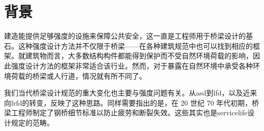 \section{背景}
建造能提供足够强度的设施来保障公共安全，这一直是工程师用于桥梁设计的基石。这种强度设计方法并不仅限于桥梁——在各种建筑规范中也可以找到相应的框架。就建筑物而言，大多数结构构件都能得到保护而不受自然环境荷载的影响，因此强度设计方法的框架非常适合该行业。然而，对于暴露在自然环境中承受各种环境荷载的桥梁或人行道，情况就有所不同了。

我们当代桥梁设计规范的重大变化也主要与强度问题有关。从\acrfull{asd}到\acrfull{lfd}，以及近来向\acrlong{lrfd}的转变，反映了这种思路。同样需要指出的是，在 20 世纪 70 年代初期，桥梁工程师制定了钢桥细节标准以防止疲劳和断裂失效。这些其实也是\gls*{servicelife}设计规定的范畴。

